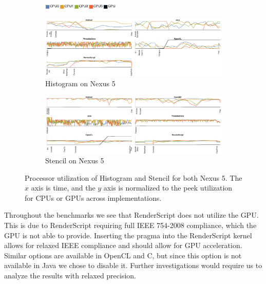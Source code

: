 \begin{figure}
  \centering

  \begin{subfigure}[b]{\textwidth}
          \centering
          \includegraphics[width=0.4\textwidth]{data/load_legend.pdf}
  \end{subfigure}

  \begin{subfigure}[b]{\textwidth}
      \centering
      \includegraphics[width=\textwidth]{data/load_histogram_nexus5.pdf}
      \caption{Histogram on Nexus 5}
      \label{fig:Histogram5}
  \end{subfigure}
  \begin{subfigure}[b]{\textwidth}
      \centering
      \includegraphics[width=\textwidth]{data/load_stencil_nexus5.pdf}
      \caption{Stencil on Nexus 5}
      \label{fig:Stencil5}
  \end{subfigure}

  \caption{Processor utilization of Histogram and Stencil for both Nexus 5. The $x$ axis is time, and the $y$ axis is normalized to the peek utilization for CPUs or GPUs across implementations.}
  \label{fig:loadHistogramStencil}
\end{figure}

Throughout the benchmarks we see that RenderScript
	does not utilize the GPU.
This is due to RenderScript requiring full
	IEEE 754-2008 compliance, which the GPU is not able to provide.
Inserting the  pragma into the
	RenderScript kernel allows for relaxed IEEE compliance and 
	should allow for GPU acceleration.
Similar options are available in OpenCL and C, but since
	this option is not available in Java we chose to disable it. 
Further investigations would require us to analyze the results with relaxed precision.

